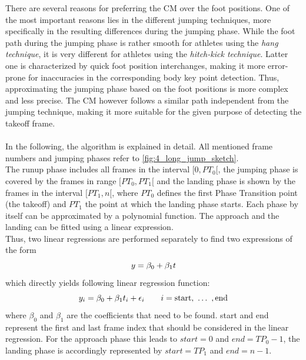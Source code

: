 There are several reasons for preferring the \ac{CM} over the foot positions.
One of the most important reasons lies in the different jumping techniques,
more specifically in the resulting differences during the jumping phase.
While the foot path during the jumping phase is rather smooth for
athletes using the \textit{hang technique}, it is very different for
athletes using the \textit{hitch-kick technique}.
Latter one is characterized by quick foot position interchanges, making it
more error-prone for inaccuracies in the corresponding body key point
detection.
Thus, approximating the jumping phase based on the foot positions is more
complex and less precise.
The \ac{CM} however follows a similar path independent from the jumping
technique, making it more suitable for the given purpose of detecting the
takeoff frame.\\\\
\noindent In the following, the algorithm is explained in detail.
All mentioned frame numbers and jumping phases refer to
\autoref{fig:4_long_jump_sketch}.\\
The runup phase includes all frames in the interval $[0, PT_0[$, the jumping
phase is covered by the frames in range $[PT_0, PT_1[$ and the landing phase
is shown by the frames in the interval $[PT_1, n[$, where $PT_0$ defines the
first Phase Transition point (the takeoff) and $PT_1$ the point at which the
landing phase starts.
Each phase by itself can be approximated by a polynomial function.
The approach and the landing can be fitted using a linear expression.\\
Thus, two linear regressions are performed separately to find two expressions
of the form
\begin{equation}\label{eq:linear_function}
    \\y = \beta_0 + \beta_1t
\end{equation}
which directly yields following linear regression function:
\begin{equation}\label{eq:linear_reg_function}
    \\y_i = \beta_0 + \beta_1t_i + \epsilon_i
    \quad\quad
    i = \text{start},\ \dots\ ,\text{end}
\end{equation}
where $\beta_0$ and $\beta_1$ are the coefficients that need to be found.
start and end represent the first and last frame index that should be
considered in the linear regression.
For the approach phase this leads to $start = 0$ and $end = TP_0 - 1$, the
landing phase is accordingly represented by $start = TP_1$ and $end = n - 1$.\\

